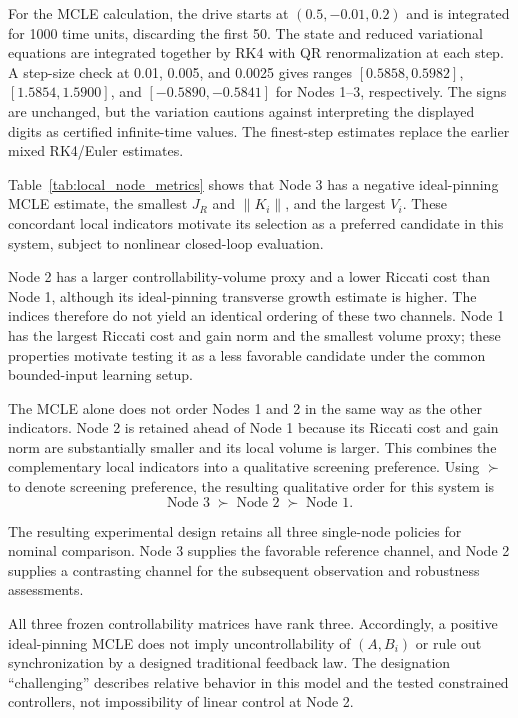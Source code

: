 \documentclass[a4paper,fleqn]{cas-sc}
\theoremstyle{plain}
\theoremstyle{definition}
\begin{document}
For the MCLE calculation, the drive starts at $(0.5,-0.01,0.2)$ and is integrated for 1000 time units, discarding the first 50. The state and reduced variational equations are integrated together by RK4 with QR renormalization at each step. A step-size check at 0.01, 0.005, and 0.0025 gives ranges $[0.5858,0.5982]$, $[1.5854,1.5900]$, and $[-0.5890,-0.5841]$ for Nodes 1--3, respectively. The signs are unchanged, but the variation cautions against interpreting the displayed digits as certified infinite-time values. The finest-step estimates replace the earlier mixed RK4/Euler estimates.

Table~\ref{tab:local_node_metrics} shows that Node 3 has a negative ideal-pinning MCLE estimate, the smallest $J_R$ and $\|K_i\|$, and the largest $V_i$. These concordant local indicators motivate its selection as a preferred candidate in this system, subject to nonlinear closed-loop evaluation.

Node 2 has a larger controllability-volume proxy and a lower Riccati cost than Node 1, although its ideal-pinning transverse growth estimate is higher. The indices therefore do not yield an identical ordering of these two channels. Node 1 has the largest Riccati cost and gain norm and the smallest volume proxy; these properties motivate testing it as a less favorable candidate under the common bounded-input learning setup.

The MCLE alone does not order Nodes 1 and 2 in the same way as the other indicators. Node 2 is retained ahead of Node 1 because its Riccati cost and gain norm are substantially smaller and its local volume is larger. This combines the complementary local indicators into a qualitative screening preference. Using $\succ$ to denote screening preference, the resulting qualitative order for this system is
\begin{equation}
	\text{Node 3}\;\succ\;\text{Node 2}\;\succ\;\text{Node 1}.
	\label{eq:node_ranking}
\end{equation}

The resulting experimental design retains all three single-node policies for nominal comparison. Node 3 supplies the favorable reference channel, and Node 2 supplies a contrasting channel for the subsequent observation and robustness assessments.

All three frozen controllability matrices have rank three. Accordingly, a positive ideal-pinning MCLE does not imply uncontrollability of $(A,B_i)$ or rule out synchronization by a designed traditional feedback law. The designation ``challenging'' describes relative behavior in this model and the tested constrained controllers, not impossibility of linear control at Node 2.
\end{document}
